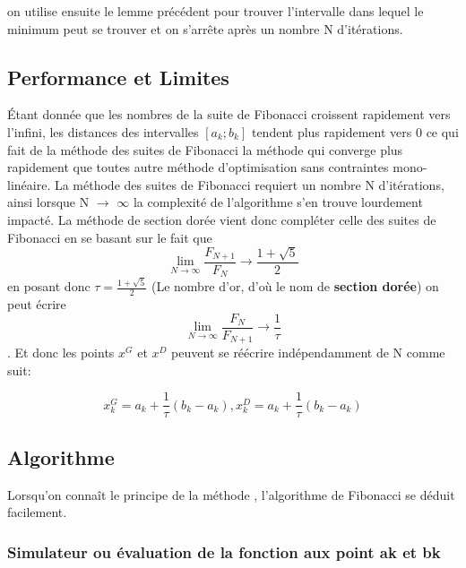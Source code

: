 \documentclass[a4paper,14pt]{article}
\begin{document}
on utilise ensuite le lemme précédent pour trouver l'intervalle dans lequel le minimum peut se trouver et on s'arrête après un nombre N d'itérations.

\subsection{Performance et Limites}

Étant donnée que les nombres de la suite de Fibonacci croissent rapidement vers l'infini, les distances des intervalles $[a_{k}; b_{k}]$ tendent plus rapidement vers 0 ce qui fait de la méthode des suites de Fibonacci la méthode qui converge plus rapidement que toutes autre méthode d'optimisation sans contraintes mono-linéaire.
La méthode des suites de Fibonacci requiert un nombre N d'itérations, ainsi lorsque N $\longrightarrow$ $\infty$ la complexité de l'algorithme s'en trouve lourdement impacté. La méthode de section dorée vient donc compléter celle des suites de Fibonacci en se basant sur le fait que \[\lim_{N\rightarrow\infty} \frac{F_{N+1}}{F_{N}} \longrightarrow \frac{1+\sqrt{5}}{2}\] en posant donc $\tau = \frac{1+\sqrt{5}}{2}$ (Le nombre d'or, d’où le nom de \textbf{section dorée}) on peut écrire \[\lim_{N\rightarrow\infty} \frac{F_{N}}{F_{N+1}} \longrightarrow \frac{1}{\tau}\]. Et donc les points $x^{G}$ et $x^{D}$ peuvent se réécrire indépendamment de N comme suit:

\[
	x^{G}_{k} = a_{k} + \frac{1}{\tau}(b_{k} - a_{k}), x^{D}_{k} = a_{k} + \frac{1}{\tau}(b_{k} - a_{k})
\]

\subsection{Algorithme}

Lorsqu'on connaît le principe de la méthode , l'algorithme de Fibonacci se déduit facilement.

\subsubsection{Simulateur ou évaluation de la fonction aux point ak et bk}
\end{document}
